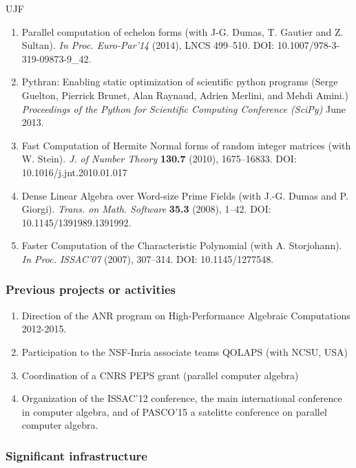 \begin{sitedescription}{UJF}
\begin{description}
\begin{enumerate}[1.]
\item Parallel computation of echelon forms (with J-G. Dumas, T. Gautier and Z. Sultan). 
\emph{In Proc. Euro-Par'14}  (2014),  LNCS 499--510. DOI: 10.1007/978-3-319-09873-9\_42.

\item Pythran: Enabling static optimization of scientific python programs
  (Serge Guelton, Pierrick Brunet, Alan Raynaud, Adrien Merlini, and Mehdi Amini.)
\emph{Proceedings of the Python for Scientific Computing Conference (SciPy)} June 2013.

\item Fast Computation of Hermite Normal forms of random integer matrices (with
W. Stein).
\emph{J. of Number Theory} {\bf{130.7}} (2010), 1675--16833. DOI: 10.1016/j.jnt.2010.01.017

\item Dense Linear Algebra over Word-size Prime Fields (with J.-G. Dumas and P. Giorgi). 
\emph{Trans. on Math. Software} {\bf{35.3}} (2008), 1--42. DOI: 10.1145/1391989.1391992.

\item Faster Computation of the Characteristic Polynomial (with A. Storjohann). 
\emph{In Proc. ISSAC'07}  (2007), 307--314. DOI: 10.1145/1277548.
\end{enumerate}

\end{description}

\subsubsection*{Previous projects or activities}

\begin{enumerate}
\item Direction of the ANR program on High-Performance Algebraic
  Computations 2012-2015.
\item Participation to the NSF-Inria associate teams QOLAPS (with NCSU, USA)
\item Coordination of a CNRS PEPS grant (parallel computer algebra)
\item Organization of the ISSAC'12 conference, the main
  international conference in computer algebra, and of PASCO'15 a satelitte
  conference on parallel computer algebra.
\end{enumerate}

\subsubsection*{Significant infrastructure}

\end{sitedescription}

